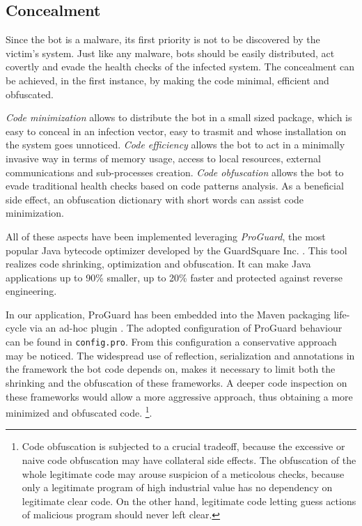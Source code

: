 \subsection{Concealment}
\label{sec:concealment}

Since the bot is a malware, its first priority is not to be discovered by the victim's system. Just like any malware, bots should be easily distributed, act covertly and evade the health checks of the infected system. The concealment can be achieved, in the first instance, by making the code minimal, efficient and obfuscated.

\textit{Code minimization} allows to distribute the bot in a small sized package, which is easy to conceal in an infection vector, easy to trasmit and whose installation on the system goes unnoticed.
\textit{Code efficiency} allows the bot to act in a minimally invasive way in terms of memory usage, access to local resources, external communications and sub-processes creation.
\textit{Code obfuscation} allows the bot to evade traditional health checks based on code patterns analysis. As a beneficial side effect, an obfuscation dictionary with short words can assist code minimization.

All of these aspects have been implemented leveraging \textit{ProGuard}, the most popular Java bytecode optimizer developed by the GuardSquare Inc. \cite{proguard}. This tool realizes code shrinking, optimization and obfuscation. It can make Java applications up to 90\% smaller, up to 20\% faster and protected against reverse engineering\cite{guardsquare}.

In our application, ProGuard has been embedded into the Maven packaging life-cycle via an ad-hoc plugin \cite{proguard-maven-plugin}. The adopted configuration of ProGuard behaviour can be found in \texttt{config.pro}. From this configuration a conservative approach may be noticed. The widespread use of reflection, serialization and annotations in the framework the bot code depends on, makes it necessary to limit both the shrinking and the obfuscation of these frameworks. A deeper code inspection on these frameworks would allow a more aggressive approach, thus obtaining a more minimized and obfuscated code. \footnote{Code obfuscation is subjected to a crucial tradeoff, because the excessive or naive code obfuscation may have collateral side effects. The obfuscation of the whole legitimate code may arouse suspicion of a meticolous checks, because only a legitimate program of high industrial value has no dependency on legitimate clear code. On the other hand, legitimate code letting guess actions of malicious program should never left clear.}.


